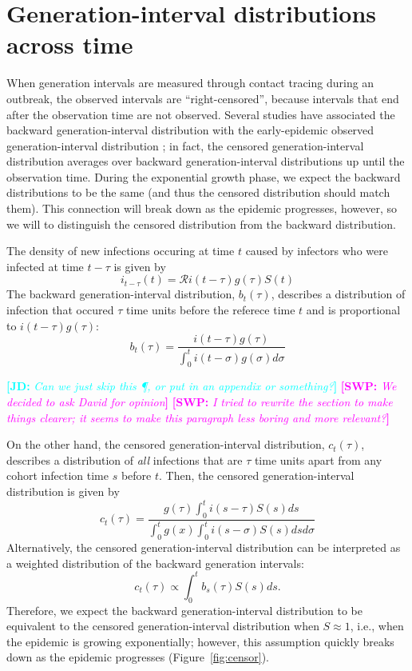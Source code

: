 \documentclass[12pt]{article}
\newcommand{\RR}{\ensuremath{{\mathcal R}}}
\newcommand{\comment}[3]{\textcolor{#1}{\textbf{[#2: }\textsl{#3}\textbf{]}}}
\newcommand{\jd}[1]{\comment{cyan}{JD}{#1}}
\newcommand{\swp}[1]{\comment{magenta}{SWP}{#1}}
\begin{document}
\section{Generation-interval distributions across time}

When generation intervals are measured through contact tracing during an outbreak, 
the observed intervals are ``right-censored'', because intervals that end after the observation time are not observed.
Several studies have associated the backward generation-interval distribution with the early-epidemic observed generation-interval distribution \citep{tomba2010some, nishiura2010time, champredon2015intrinsic, britton2019estimation};
in fact, the censored generation-interval distribution averages over backward generation-interval distributions up until the observation time.
During the exponential growth phase, we expect the backward distributions to be the same (and thus the censored distribution should match them).
This connection will break down as the epidemic progresses, however, so we will to distinguish the censored distribution from the backward distribution.

The density of new infections occuring at time $t$ caused by infectors who were infected at time $t-\tau$ is given by
\begin{equation}
i_{t-\tau}(t) = \RR i(t-\tau) g(\tau) S(t)
\end{equation}
The backward generation-interval distribution, $b_t(\tau)$, describes a distribution of infection that occured $\tau$ time units before the referece time $t$ and is proportional to $i(t-\tau) g(\tau)$:
\begin{equation}
b_t(\tau) = \frac{i(t-\tau) g(\tau)}{\int_0^t i(t-\sigma) g(\sigma) d\sigma}
\end{equation}

\jd{Can we just skip this \P, or put in an appendix or something?}
\swp{We decided to ask David for opinion}
\swp{I tried to rewrite the section to make things clearer; it seems to make this paragraph less boring and more relevant?}

On the other hand, the censored generation-interval distribution, $c_t(\tau)$, describes a distribution of \emph{all} infections that are $\tau$ time units apart from any cohort infection time $s$ before $t$.
Then, the censored generation-interval distribution is given by
\begin{equation}\label{eq:obsg}
c_t(\tau) = \frac{g(\tau) \int_0^t i(s-\tau) S(s) ds}{\int_0^t g(x) \int_0^t i(s-\sigma) S(s) ds d\sigma}
\end{equation}
Alternatively, the censored generation-interval distribution can be interpreted as a weighted distribution of the backward generation intervals:
\begin{equation}
c_t(\tau) \propto \int_0^t b_s(\tau) S(s) ds.
\end{equation}
Therefore, we expect the backward generation-interval distribution to be equivalent to the censored generation-interval distribution when $S \approx 1$, i.e., when the epidemic is growing exponentially;
however, this assumption quickly breaks down as the epidemic progresses (Figure~\ref{fig:censor}).
\end{document}
